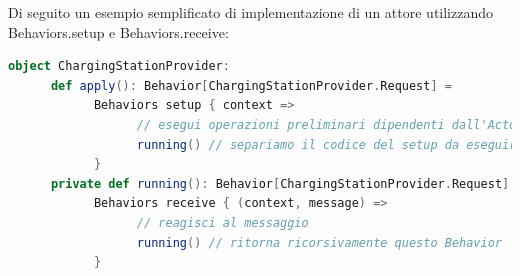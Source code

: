 Di seguito un esempio semplificato di implementazione di un attore utilizzando Behaviors.setup e Behaviors.receive:\\

\begin{lstlisting}[language=scala]
object ChargingStationProvider:
      def apply(): Behavior[ChargingStationProvider.Request] = 
            Behaviors setup { context =>
                  // esegui operazioni preliminari dipendenti dall'Actor Context
                  running() // separiamo il codice del setup da eseguire una sola volta con il codice effettivo del Behavior
            }
      private def running(): Behavior[ChargingStationProvider.Request] = 
            Behaviors receive { (context, message) =>
                  // reagisci al messaggio
                  running() // ritorna ricorsivamente questo Behavior
            }
\end{lstlisting}

